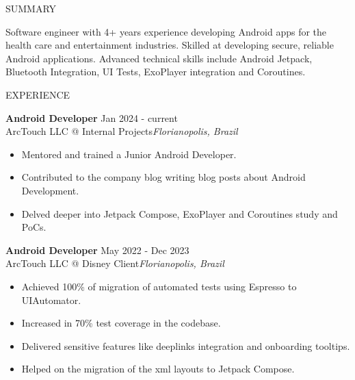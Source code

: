 \documentclass{template/faangpath}
\begin{document}
\begin{rSection}{SUMMARY}

Software engineer with 4+ years experience developing Android apps for the health care 
and entertainment industries. Skilled at developing secure, reliable Android applications. 
Advanced technical skills include Android Jetpack, Bluetooth Integration, UI Tests, 
ExoPlayer integration and Coroutines.

\end{rSection}


\begin{rSection}{EXPERIENCE}

\textbf{Android Developer} \hfill Jan 2024 - current\\
ArcTouch LLC @ Internal Projects\hfill \textit{Florianopolis, Brazil}
 \begin{itemize}
    \itemsep -3pt {} 
     \item Mentored and trained a Junior Android Developer.
     \item Contributed to the company blog writing blog posts about Android Development.
     \item Delved deeper into Jetpack Compose, ExoPlayer and Coroutines study and PoCs.
 \end{itemize}

\textbf{Android Developer} \hfill May 2022 - Dec 2023\\
ArcTouch LLC @ Disney Client\hfill \textit{Florianopolis, Brazil}
 \begin{itemize}
    \itemsep -3pt {} 
     \item Achieved 100\% of migration of automated tests using Espresso to UIAutomator.
     \item Increased in 70\% test coverage in the codebase. 
     \item Delivered sensitive features like deeplinks integration and onboarding tooltips.
     \item Helped on the migration of the xml layouts to Jetpack Compose.
 \end{itemize}
 

\end{rSection}
\end{document}
